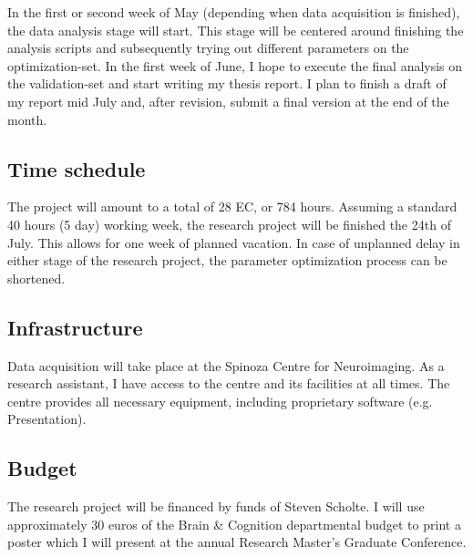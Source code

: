 \documentclass[12pt,a4paper]{article}\usepackage[]{graphicx}\usepackage[]{color}
\begin{document}
In the first or second week of May (depending when data acquisition is finished), the data analysis stage will start. This stage will be centered around finishing the analysis scripts and subsequently trying out different parameters on the optimization-set. In the first week of June, I hope to execute the final analysis on the validation-set and start writing my thesis report. I plan to finish a draft of my report mid July and, after revision, submit a final version at the end of the month.

\subsection{Time schedule}
The project will amount to a total of 28 EC, or  784 hours. Assuming a standard 40 hours (5 day) working week, the research project will be finished the 24th of July. This allows for one week of planned vacation. In case of unplanned delay in either stage of the research project, the parameter optimization process can be shortened. 

\subsection{Infrastructure}
Data acquisition will take place at the Spinoza Centre for Neuroimaging. As a research assistant, I have access to the centre and its facilities at all times. The centre provides all necessary equipment, including proprietary software (e.g. Presentation). 

\subsection{Budget}
The research project will be financed by funds of Steven Scholte. I will use approximately 30 euros of the Brain \& Cognition departmental budget to print a poster which I will present at the annual Research Master's Graduate Conference. \\
\end{document}
